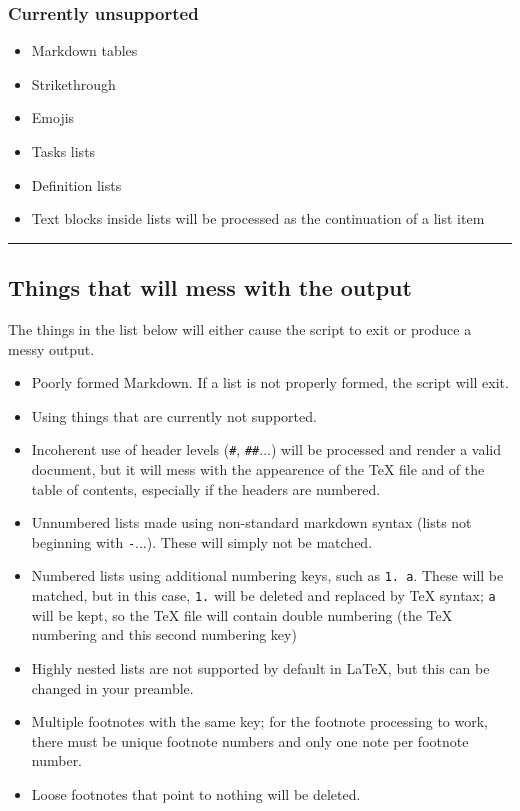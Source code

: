 \subsubsection{Currently unsupported}

\begin{itemize}
\item Markdown tables
\item Strikethrough
\item Emojis
\item Tasks lists
\item Definition lists
\item Text blocks inside lists will be processed as the continuation of a list item 
\end{itemize}

\par\noindent\rule{\linewidth}{0.4pt}
\subsection{Things that will mess with the output}

The things in the list below will either cause the script to exit or produce a messy output.

\begin{itemize}
\item Poorly formed Markdown. If a list is not properly formed, the script will exit.
\item Using things that are currently not supported.
\item Incoherent use of header levels (\texttt{\#}, \texttt{\#\#}...) will be processed and render a valid document, but it will mess with the appearence of the TeX file and of the table of contents, especially if the headers are numbered.
\item Unnumbered lists made using non-standard markdown syntax (lists not beginning with \texttt{-}...). These will simply not be matched.
\item Numbered lists using additional numbering keys, such as \texttt{1. a}. These will be matched, but in this case, \texttt{1.} will be deleted and replaced by TeX syntax; \texttt{a} will be kept, so the TeX file will contain double numbering (the TeX numbering and this second numbering key)
\item Highly nested lists are not supported by default in LaTeX, but this can be changed in your preamble.
\item Multiple footnotes with the same key; for the footnote processing to work, there must be unique footnote numbers and only one note per footnote number.
\item Loose footnotes that point to nothing will be deleted. 
\end{itemize}


